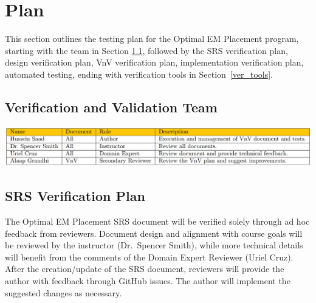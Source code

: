 \documentclass[12pt, titlepage]{article}
\begin{document}
\section{Plan}
This section outlines the testing plan for the Optimal EM Placement program, starting with the team in Section \ref{team}, followed by the SRS verification plan, design verification plan, VnV verification plan, implementation verification plan, automated testing, ending with verification tools in Section~\ref{ver_tools}.

\subsection{Verification and Validation Team} \label{team}
\begin{center}
  \includegraphics[scale=0.35]{VnVTeam.PNG} \label{team_table}
\end{center}

\subsection{SRS Verification Plan}
The Optimal EM Placement SRS document will be verified solely through ad hoc feedback from reviewers. Document design and alignment with course goals will be reviewed by the instructor (Dr.~Spencer Smith), while more technical details will benefit from the comments of the Domain Expert Reviewer (Uriel Cruz). After the creation/update of the SRS document, reviewers will provide the author with feedback through GitHub issues. The author will implement the suggested changes as necessary.
\end{document}
